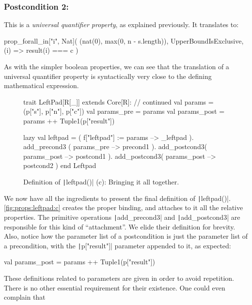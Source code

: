 \documentclass[11pt]{article}
\renewcommand{\vref}[1]{\autoref{#1} \vpageref{#1}}{}
\newcommand{\ScalaI}[1]{\texttt|#1|}
\begin{document}
\subsubsection*{Postcondition 2: \leftpadpostb}

\noindent This is a \textit{universal quantifier property}, as explained previously. It translates to:

\begin{ScalaBlockSimple}
prop_forall_in["i", Nat](
  (nat(0), max(0, n - s.length)),
  UpperBoundIsExclusive,
  (i) => result(i) === c
)
\end{ScalaBlockSimple}

\noindent As with the simpler boolean properties, we can see that the translation of a universal quantifier property is syntactically very close to the defining mathematical expression. 

\begin{figure}[tb]
\begin{ScalaBlock}
trait LeftPad[R[_]] extends Core[R]:
  // continued
  val params      = (p["s"], p["n"], p["c"])
  val params_pre  = params
  val params_post = params ++ Tuple1(p["result"])
  
  lazy val leftpad =
      ( f["leftpad"] := params --> _leftpad ).
        add_precond3 ( params_pre  --> precond1 ).
        add_postcond3( params_post --> postcond1 ).
        add_postcond3( params_post --> postcond2 )
end Leftpad
\end{ScalaBlock}
\caption{Definition of \ScalaI{leftpad()} (c): Bringing it all together.}
\label{fig:props:leftpad:c}
\hrulefill
\end{figure}

We now have all the ingredients to present the final definition of \ScalaI{leftpad()}. \vref{fig:props:leftpad:c} creates the proper binding, and attaches to it all the relative properties. The primitive operations \ScalaI{add_precond3} and \ScalaI{add_postcond3} are responsible for this kind of ``attachment''. We elide their definition for brevity. Also, notice how the parameter list of a postcondition is just the parameter list of a precondition, with the \ScalaI{p["result"]} parameter appended to it, as expected:

\begin{ScalaBlockSimple}
val params_post = params ++ Tuple1(p["result"])
\end{ScalaBlockSimple}

\noindent These definitions related to parameters are given in order to avoid repetition. There is no other essential requirement for their existence. One could even complain that
\end{document}
